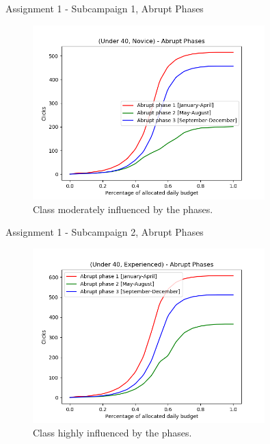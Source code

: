 \documentclass[11pt]{beamer}
\begin{document}
\begin{frame}{Assignment 1 - Subcampaign 1, Abrupt Phases}
\begin{figure}[hbtp]
\centering
\includegraphics[width=0.8\textwidth]{images/subcampaign_2_abrupt_phases.png}
\caption{Class moderately influenced by the phases.}
\end{figure}
\end{frame}

\begin{frame}{Assignment 1 - Subcampaign 2, Abrupt Phases}
\begin{figure}[hbtp]
\centering
\includegraphics[width=0.8\textwidth]{images/subcampaign_3_abrupt_phases.png}
\caption{Class highly influenced by the phases.}
\end{figure}
\end{frame}
\end{document}
